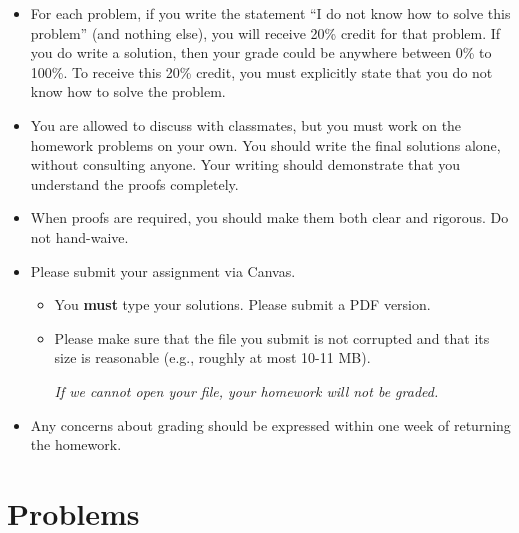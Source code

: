 \documentclass[11pt]{amsart}
\begin{document}
\begin{itemize}

\item %
For each problem, if you write  the statement ``I do not know how to solve this problem'' (and nothing else), you will receive 20\% credit for that problem. If you do write a solution, then your grade could be anywhere between 0\% to 100\%.
To receive this 20\% credit, you must explicitly state that you do not know how to solve the problem.

\item You are allowed to discuss with classmates, but you must work on the homework problems on your own.  You should write the final solutions alone, without consulting anyone. Your writing should demonstrate that you understand the proofs completely.

\item When proofs are required, you should make them both clear and rigorous. Do not hand-waive.

 \item Please submit your assignment via Canvas.
 \begin{itemize}
\item  You \textbf{must} type your solutions. Please submit a PDF version.
\item Please make sure that the file you submit is not corrupted and that its size is reasonable (e.g., roughly at most 10-11 MB).
\begin{center}
\emph{If we cannot open your file, your homework will not be graded.}
\end{center}
\end{itemize}

\item Any concerns about grading should be expressed within one week of
returning the homework. 
 
\end{itemize}

\section*{Problems}

%
\end{document}
